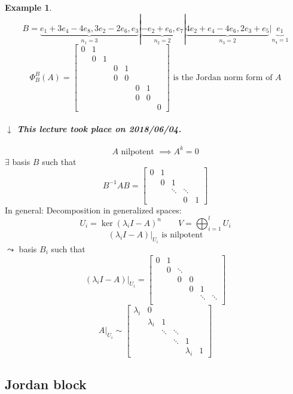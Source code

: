 \documentclass[a4paper]{article}
\newcounter{lecref}[section]
\numberwithin{lecref}{section}
\newtheorem{example}[lecref]{Example}
\newcommand{\dateref}[1]{%
  \begin{mdframed}[backgroundcolor=gray!10,innerbottommargin=0pt,innertopmargin=0pt]
    \paragraph{\textit{$\downarrow$ This lecture took place on #1.}}%
  \end{mdframed}%
}
\begin{document}
\begin{example}
  \[
    B = \underbrace{e_1 + 3e_4 - 4e_8, 3e_2 - 2e_6, e_3}_{n_1 = 3} | \underbrace{-e_2+e_6, e_7}_{n_2 = 2} | \underbrace{4e_2 + e_4 - 4e_6, 2e_3 + e_5}_{n_3 = 2} | \underbrace{e_1}_{n_4 = 1}
  \] \[
    \Phi_B^B(A) = \begin{bmatrix}
      0 & 1 &   &   &   &   &   & \\
        & 0 & 1 &   &   &   &   & \\
        &   &   & 0 & 1 &   &   & \\
        &   &   & 0 & 0 &   &   & \\
        &   &   &   &   & 0 & 1 & \\
        &   &   &   &   & 0 & 0 & \\
        &   &   &   &   &   &   & 0
    \end{bmatrix}
    \text{ is the Jordan norm form of } A
  \]
\end{example}

\dateref{2018/06/04}

\[ A \text{ nilpotent } \implies A^k = 0 \]
$\exists$ basis $B$ such that 
\[ B^{-1}AB = \begin{bmatrix} 0 & 1 & & & \\ & 0 & 1 & & \\ & & \ddots & \ddots & \\ & & & 0 & 1 \end{bmatrix} \]
In general:
Decomposition in generalized spaces:
\[ U_i = \ker(\lambda_i I - A)^n \qquad V = \bigoplus_{i=1}^l U_i \]
\[ (\lambda_i I - A)|_{U_i} \text{ is nilpotent} \]
$\leadsto$ basis $B_i$ such that
\[ (\lambda_i I - A)|_{U_i} = \begin{bmatrix}
  0 & 1 & & & & \\
  & 0 & \ddots & & & \\
  & & 0 & 0 & & \\
  & & & 0 & 1 & \\
  & & & & \ddots & \ddots \\
\end{bmatrix} \]
\[
  A|_{U_i} \sim
  \begin{bmatrix}
    \lambda_i & 0 & & & & \\
    & \lambda_i & 1 & & & \\
    & & \ddots & \ddots & & \\
    & & & \ddots & 1 & \\
    & & & & \lambda_i & 1
  \end{bmatrix}
\]

\subsection{Jordan block}
\end{document}
